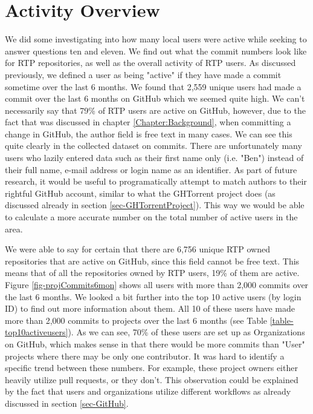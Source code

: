 \section{Activity Overview}
\label{sec-ActivityOverview}
We did some investigating into how many local users were active while seeking to answer questions ten and eleven. We find out what the commit numbers look like for RTP repositories, as well as the overall activity of RTP users. As discussed previously, we defined a user as being "active" if they  have made a commit sometime over the last 6 months. We found that 2,559 unique users had made a commit over the last 6 months on GitHub which we seemed quite high. We can't necessarily say that 79\% of RTP users are active on GitHub, however, due to the fact that was discussed in chapter \ref{Chapter:Background}, when committing a change in GitHub, the author field is free text in many cases. We can see this quite clearly in the collected dataset on commits. There are unfortunately many users who lazily entered data such as their first name only (i.e. "Ben") instead of their full name, e-mail address or login name as an identifier. As part of future research, it would be useful to programatically attempt to match authors to their rightful GitHub account, similar to what the GHTorrent project does (as discussed already in section \ref{sec-GHTorrentProject}). This way we would be able to calculate a more accurate number on the total number of active users in the area.

We were able to say for certain that there are 6,756 unique RTP owned repositories that are active on GitHub, since this field cannot be free text. This means that of all the repositories owned by RTP users, 19\% of them are active. Figure \ref{fig-projCommits6mon} shows all users with more than 2,000 commits over the last 6 months. We looked a bit further into the top 10 active users (by login ID) to find out more information about them. All 10 of these users have made more than 2,000 commits to projects over the last 6 months (see Table \ref{table-top10activeusers}). As we can see, 70\% of these users are set up as Organizations on GitHub, which makes sense in that there would be more commits than "User" projects where there may be only one contributor. It was hard to identify a specific trend between these numbers. For example, these project owners either heavily utilize pull requests, or they don't. This observation could be explained by the fact that users and organizations utilize different workflows as already discussed in section \ref{sec-GitHub}.



